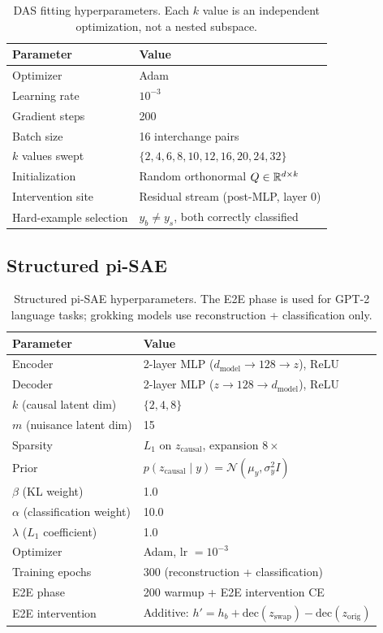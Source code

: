 \begin{table}[H]
\centering
\small
\begin{tabular}{ll}
\toprule
\textbf{Parameter} & \textbf{Value} \\
\midrule
Optimizer & Adam \\
Learning rate & $10^{-3}$ \\
Gradient steps & 200 \\
Batch size & 16 interchange pairs \\
$k$ values swept & $\{2, 4, 6, 8, 10, 12, 16, 20, 24, 32\}$ \\
Initialization & Random orthonormal $Q \in \mathbb{R}^{d \times k}$ \\
Intervention site & Residual stream (post-MLP, layer 0) \\
Hard-example selection & $y_b \neq y_s$, both correctly classified \\
\bottomrule
\end{tabular}
\caption{DAS fitting hyperparameters. Each $k$ value is an independent
optimization, not a nested subspace.}
\label{tab:hp_das}
\end{table}

\subsection{Structured pi-SAE}

\begin{table}[H]
\centering
\small
\begin{tabular}{ll}
\toprule
\textbf{Parameter} & \textbf{Value} \\
\midrule
Encoder & 2-layer MLP ($d_\text{model} \to 128 \to z$), ReLU \\
Decoder & 2-layer MLP ($z \to 128 \to d_\text{model}$), ReLU \\
$k$ (causal latent dim) & $\{2, 4, 8\}$ \\
$m$ (nuisance latent dim) & 15 \\
Sparsity & $L_1$ on $z_\text{causal}$, expansion $8\times$ \\
Prior & $p(z_\text{causal} \mid y) = \mathcal{N}(\mu_y, \sigma_y^2 I)$ \\
$\beta$ (KL weight) & 1.0 \\
$\alpha$ (classification weight) & 10.0 \\
$\lambda$ ($L_1$ coefficient) & 1.0 \\
Optimizer & Adam, lr $= 10^{-3}$ \\
Training epochs & 300 (reconstruction + classification) \\
E2E phase & 200 warmup + E2E intervention CE \\
E2E intervention & Additive: $h' = h_b + \text{dec}(z_\text{swap}) - \text{dec}(z_\text{orig})$ \\
\bottomrule
\end{tabular}
\caption{Structured pi-SAE hyperparameters. The E2E phase is used for
GPT-2 language tasks; grokking models use reconstruction + classification only.}
\label{tab:hp_pisae}
\end{table}

